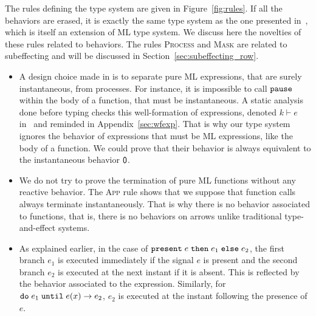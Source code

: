 \documentclass[9pt,preprint]{sigplanconf}
\begin{document}
The rules defining the type system are given in Figure~\ref{fig:rules}. If all the behaviors are erased, it is exactly the same type system as the one presented in~\cite{Mandel:2005}, which is itself an extension of ML type system. We discuss here the novelties of these rules related to behaviors. The rules \textsc{Process} and \textsc{Mask} are related to subeffecting and will be discussed in Section~\ref{sec:subeffecting_row}. 

\begin{itemize}

\item A design choice made in \rml{} is to separate pure ML expressions, that are surely instantaneous, from processes. For instance, it is impossible to call $\mathtt{pause}$ within the body of a function, that must be instantaneous. A static analysis done before typing checks this well-formation of expressions, denoted $k \vdash e$ in~\cite{Mandel:2005} and reminded in Appendix~\ref{sec:wfexp}. That is why our type system ignores the behavior of expressions that must be ML expressions, like the body of a function. We could prove that their behavior is always equivalent to the instantaneous behavior $\textsf{0}$.


\item We do not try to prove the termination of pure ML functions without any reactive behavior. The \textsc{App} rule shows that we suppose that function calls always terminate instantaneously. That is why there is no behavior associated to functions, that is, there is no behaviors on arrows unlike traditional type-and-effect systems.

\item As explained earlier, in the case of $\mathtt{present}\; e \;\mathtt{then}\; e_1 \;\mathtt{else}\; e_2$, the first branch $e_1$ is executed immediately if the signal $e$ is present and the second branch $e_2$ is executed at the next instant if it is absent. This is reflected by the behavior associated to the expression. Similarly, for $\mathtt{do}\; e_1 \;\mathtt{until}\; e(x) \rightarrow e_2$, $e_2$ is executed at the instant following the presence of $e$.


\end{itemize}
\end{document}
